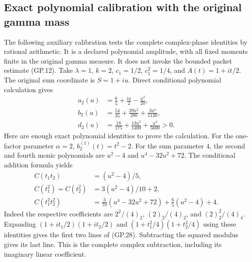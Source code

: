 \subsection{Exact polynomial calibration with the original gamma mass}
The following auxiliary calibration tests the complete complex-phase
identities by rational arithmetic. It is a declared polynomial amplitude,
with all fixed moments finite in the original gamma measure. It does not
invoke the bounded packet estimate (GP.12). Take $\lambda=1$, $k=2$,
$c_1=1/2$, $c_1^2=1/4$, and $A(t)=1+it/2$. The original sum coordinate
is $S=1+iu$. Direct conditional polynomial calculation gives
\begin{equation}
 \begin{aligned}
 a_2(u)&=\frac65+\frac{iu}{2}-\frac{u^2}{20},\\
 b_2(u)&=\frac{54}{35}+\frac{39u^2}{280}+\frac{3u^4}{1120},\\
 d_2(u)&=\frac{18}{175}+\frac{13u^2}{1400}+\frac{u^4}{5600}>0.
 \end{aligned}
 \tag{GP.28}
\end{equation}
Here are enough exact polynomial identities to prove the calculation.
For the one-factor parameter $\alpha=2$, $b_2^{(1)}(t)=t^2-2$.
For the sum parameter $4$, the second and fourth monic polynomials are
$u^2-4$ and $u^4-32u^2+72$. The conditional addition formula yields
\begin{align*}
 C(t_1t_2)&=(u^2-4)/5,\\
 C(t_1^2)=C(t_2^2)&=3(u^2-4)/10+2,\\
 C(t_1^2t_2^2)&=\frac3{70}(u^4-32u^2+72)
                        +\frac65(u^2-4)+4.
\end{align*}
Indeed the respective coefficients are
$2^2/(4)_2$, $(2)_2/(4)_2$, and $(2)_2^2/(4)_4$.
Expanding $(1+it_1/2)(1+it_2/2)$ and
$(1+t_1^2/4)(1+t_2^2/4)$ using these identities gives the first two
lines of (GP.28). Subtracting the squared modulus gives its last line.
This is the complete complex subtraction, including its imaginary
linear coefficient.

